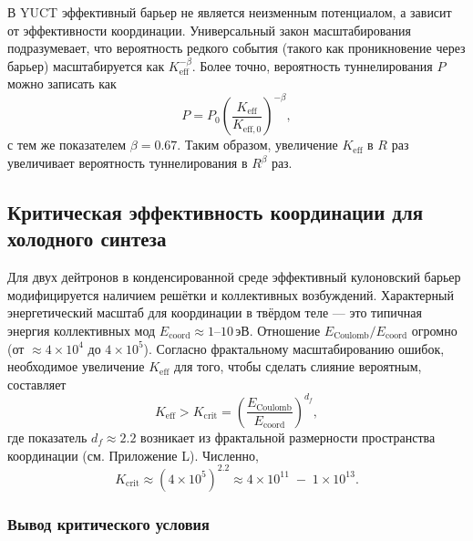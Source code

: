 \documentclass[12pt]{article}
\theoremstyle{remark}
\newcommand{\Keff}{K_{\mathrm{eff}}}
\newcommand{\Keffzero}{K_{\mathrm{eff},0}}
\newcommand{\df}{d_{\!f}}
\newcommand{\Kcrit}{K_{\mathrm{crit}}}
\begin{document}
	В YUCT эффективный барьер не является неизменным потенциалом, а зависит от эффективности координации. Универсальный закон масштабирования подразумевает, что вероятность редкого события (такого как проникновение через барьер) масштабируется как \(\Keff^{-\beta}\). Более точно, вероятность туннелирования \(P\) можно записать как
	\begin{equation}
		P = P_0 \left( \frac{\Keff}{\Keffzero} \right)^{-\beta},
		\label{eq:tunnel}
	\end{equation}
	с тем же показателем \(\beta = 0.67\). Таким образом, увеличение \(\Keff\) в \(R\) раз увеличивает вероятность туннелирования в \(R^{\beta}\) раз.
	
	\subsection{Критическая эффективность координации для холодного синтеза}
	
	Для двух дейтронов в конденсированной среде эффективный кулоновский барьер модифицируется наличием решётки и коллективных возбуждений. Характерный энергетический масштаб для координации в твёрдом теле — это типичная энергия коллективных мод \(E_{\mathrm{coord}} \approx 1\)–\(10\,\text{эВ}\). Отношение \(E_{\text{Coulomb}}/E_{\mathrm{coord}}\) огромно (от \(\approx 4\times10^4\) до \(4\times10^5\)). Согласно фрактальному масштабированию ошибок, необходимое увеличение \(\Keff\) для того, чтобы сделать слияние вероятным, составляет
	\begin{equation}
		\Keff > \Kcrit = \left( \frac{E_{\text{Coulomb}}}{E_{\mathrm{coord}}} \right)^{\df},
		\label{eq:Kcrit}
	\end{equation}
	где показатель \(\df \approx 2.2\) возникает из фрактальной размерности пространства координации (см. Приложение L). Численно,
	\[
	\Kcrit \approx (4\times10^5)^{2.2} \approx 4\times10^{11} \;-\; 1\times10^{13}.
	\]
	
	\subsubsection{Вывод критического условия}
	
\end{document}
